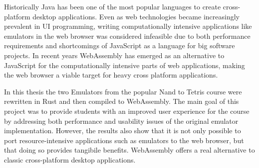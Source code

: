 Historically Java has been one of the most popular languages to create cross-platform desktop applications. Even as web technologies became increasingly prevalent in UI programming, writing computationally intensive applications like emulators in the web browser was considered infeasible due to both performance requirements and shortcomings of JavaScript as a language for big software projects.
In recent years WebAssembly has emerged as an alternative to JavaScript for the computationally intensive parts of web applications, making the web browser a viable target for heavy cross platform applications.

In this thesis the two Emulators from the popular Nand to Tetris course were rewritten in Rust and then compiled to WebAssembly.
The main goal of this project was to provide students with an improved user experience for the course by addressing both performance and usability issues of the original emulator implementation. However, the results also show that it is not only possible to port resource-intensive applications such as emulators to the web browser, but that doing so provides tangibile benefits. WebAssembly offers a real alternative to classic cross-platform desktop applications.
